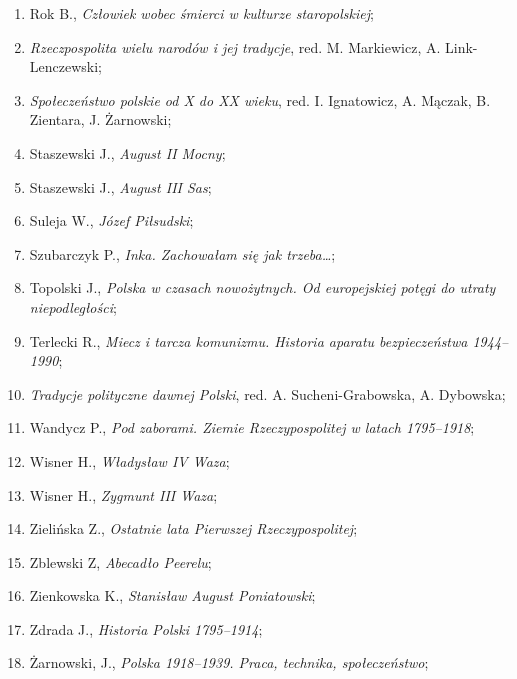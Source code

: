 \documentclass[a4paper,11pt]{article}
\begin{document}
\begin{enumerate}
\item Rok B., \emph{Człowiek wobec śmierci w kulturze staropolskiej};

\item \emph{Rzeczpospolita wielu narodów i jej tradycje}, red. M.
  Markiewicz, A. Link-Lenczewski;

\item \emph{Społeczeństwo polskie od X do XX wieku}, red. I.
  Ignatowicz, A. Mączak, B. Zientara, J. Żarnowski;

\item Staszewski J., \emph{August II Mocny};

\item Staszewski J., \emph{August III Sas};

\item Suleja W., \emph{Józef Piłsudski};

\item Szubarczyk P., \emph{Inka. Zachowałam się jak trzeba\ldots};

\item Topolski J., \emph{Polska w czasach nowożytnych. Od europejskiej
    potęgi do utraty niepodległości};

\item Terlecki R., \emph{Miecz i tarcza komunizmu. Historia aparatu
    bezpieczeństwa 1944--1990};

\item \emph{Tradycje polityczne dawnej Polski}, red. A.
  Sucheni-Grabowska, A. Dybowska;

\item Wandycz P., \emph{Pod zaborami. Ziemie Rzeczypospolitej w latach
    1795--1918};

\item Wisner H., \emph{Władysław IV Waza};

\item Wisner H., \emph{Zygmunt III Waza};

\item Zielińska Z., \emph{Ostatnie lata Pierwszej Rzeczypospolitej};

\item Zblewski Z, \emph{Abecadło Peerelu};

\item Zienkowska K., \emph{Stanisław August Poniatowski};

\item Zdrada J., \emph{Historia Polski 1795--1914};

\item Żarnowski, J., \emph{Polska 1918--1939. Praca, technika,
    społeczeństwo};


\end{enumerate}
\end{document}
